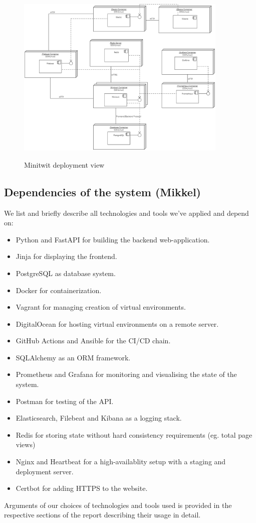 \documentclass{article}
\begin{document}
\begin{figure}[h]
\includegraphics[width=0.9\textwidth]{images/Deployment_View_Picture.png}
\label{fig:deployment_view}
\caption{Minitwit deployment view}
\centering
\end{figure}

\subsection{Dependencies of the system (Mikkel)}
We list and briefly describe all technologies and tools we've applied and depend on:
\begin{itemize}
    \item Python and FastAPI for building the backend web-application.
    \item Jinja for displaying the frontend.
    \item PostgreSQL as database system.
    \item Docker for containerization.
    \item Vagrant for managing creation of virtual environments.
    \item DigitalOcean for hosting virtual environments on a remote server.
    \item GitHub Actions and Ansible for the CI/CD chain.
    \item SQLAlchemy as an ORM framework.
    \item Prometheus and Grafana for monitoring and visualising the state of the system.
    \item Postman for testing of the API.
    \item Elasticsearch, Filebeat and Kibana as a logging stack.
    \item Redis for storing state without hard consistency requirements (eg. total page views)
    \item Nginx and Heartbeat for a high-availablity setup with a staging and deployment server.
    \item Certbot for adding HTTPS to the website.
\end{itemize}
Arguments of our choices of technologies and tools used is provided in the respective sections of the report describing their usage in detail.
\end{document}
